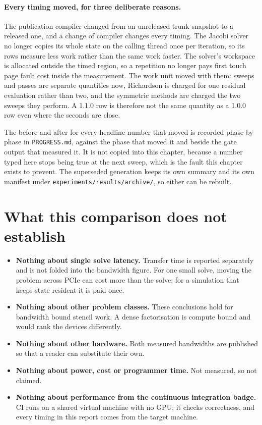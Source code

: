 \paragraph{Every timing moved, for three deliberate reasons.} The publication
compiler changed from an unreleased trunk snapshot to a released one, and a
change of compiler changes every timing. The Jacobi solver no longer copies its
whole state on the calling thread once per iteration, so its rows measure less
work rather than the same work faster. The solver's workspace is allocated
outside the timed region, so a repetition no longer pays first touch page fault
cost inside the measurement. The work unit moved with them: sweeps and passes
are separate quantities now, Richardson is charged for one residual evaluation
rather than two, and the symmetric methods are charged the two sweeps they
perform. A 1.1.0 row is therefore not the same quantity as a 1.0.0 row even
where the seconds are close.

The before and after for every headline number that moved is recorded phase by
phase in \texttt{PROGRESS.md}, against the phase that moved it and beside the
gate output that measured it. It is not copied into this chapter, because a
number typed here stops being true at the next sweep, which is the fault this
chapter exists to prevent. The superseded generation keeps its own summary and
its own manifest under \texttt{experiments/results/archive/}, so either can be
rebuilt.

\section{What this comparison does not establish}

\begin{itemize}
  \item \textbf{Nothing about single solve latency.} Transfer time is reported
        separately and is not folded into the bandwidth figure. For one small
        solve, moving the problem across PCIe can cost more than the solve; for a
        simulation that keeps state resident it is paid once.
  \item \textbf{Nothing about other problem classes.} These conclusions hold for
        bandwidth bound stencil work. A dense factorisation is compute bound and
        would rank the devices differently.
  \item \textbf{Nothing about other hardware.} Both measured bandwidths are
        published so that a reader can substitute their own.
  \item \textbf{Nothing about power, cost or programmer time.} Not measured, so
        not claimed.
  \item \textbf{Nothing about performance from the continuous integration
        badge.} CI runs on a shared virtual machine with no GPU; it checks
        correctness, and every timing in this report comes from the target
        machine.
\end{itemize}
